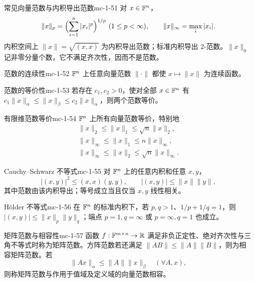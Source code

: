 \begin{definition}{常见向量范数与内积导出范数}{mc-1-51}
对 $x\in\mathbb{F}^n$，
\[\|x\|_p=\Bigl(\sum_{i=1}^n|x_i|^p\Bigr)^{1/p}\ (1\leq p<\infty),\qquad\|x\|_\infty=\max_i|x_i|.\]
内积空间上 $\|x\|=\sqrt{(x,x)}$ 为内积导出范数；标准内积导出 $2$-范数。$\|x\|_0$ 记非零分量个数，它不满足齐次性，因而不是范数。
\end{definition}

\begin{theorem}{范数的连续性}{mc-1-52}
$\mathbb{F}^n$ 上任意向量范数 $\|\cdot\|$ 都使 $x\mapsto\|x\|$ 为连续函数。
\end{theorem}

\begin{definition}{范数的等价性}{mc-1-53}
若存在 $c_1,c_2>0$，使对全部 $x\in\mathbb{F}^n$ 有 $c_1\|x\|_\alpha\leq\|x\|_\beta\leq c_2\|x\|_\alpha$，则两个范数等价。
\end{definition}

\begin{theorem}{有限维范数等价}{mc-1-54}
$\mathbb{F}^n$ 上所有向量范数等价，特别地
\[
\begin{gathered}
\|x\|_2\leq\|x\|_1\leq\sqrt n\|x\|_2,\\
\|x\|_\infty\leq\|x\|_1\leq n\|x\|_\infty,\\
\|x\|_\infty\leq\|x\|_2\leq\sqrt n\|x\|_\infty.
\end{gathered}
\]
\end{theorem}

\begin{theorem}{Cauchy--Schwarz 不等式}{mc-1-55}
对 $\mathbb{F}^n$ 上的任意内积和任意 $x,y$，
\[|(x,y)|^2\leq(x,x)(y,y),\qquad|(x,y)|\leq\|x\|\|y\|,\]
其中范数由该内积导出；等号成立当且仅当 $x,y$ 线性相关。
\end{theorem}

\begin{theorem}{Hölder 不等式}{mc-1-56}
在 $\mathbb{F}^n$ 的标准内积下，若 $p,q>1$、$1/p+1/q=1$，则 $|(x,y)|\leq\|x\|_p\|y\|_q$；端点 $p=1,q=\infty$ 或 $p=\infty,q=1$ 也成立。
\end{theorem}

\begin{definition}{矩阵范数与相容性}{mc-1-57}
函数 $f:\mathbb{F}^{m\times n}\to\mathbb{R}$ 满足非负正定性、绝对齐次性与三角不等式时称为矩阵范数。方阵范数若还满足 $\|AB\|\leq\|A\|\|B\|$，则为相容矩阵范数。若
\[\|Ax\|_\alpha\leq\|A\|\|x\|_\beta\quad(\forall A,x),\]
则称矩阵范数与作用于值域及定义域的向量范数相容。
\end{definition}

